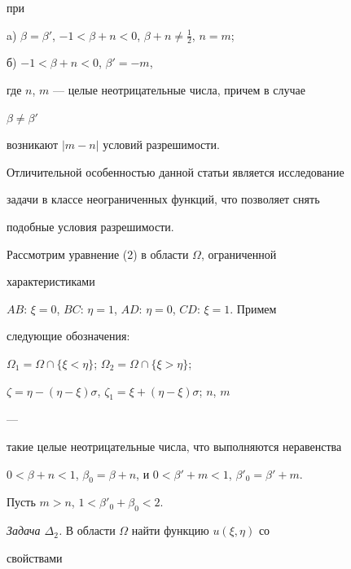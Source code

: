 при 


 


a) $\beta=\beta'$, $-1<\beta+n<0$, $\beta+n\ne\frac{1}{2}$, $n=m$; 


 


б) $-1<\beta+n<0$, $\beta'=-m$, 


 


\noindent{}где $n$, $m$ --- целые неотрицательные числа, причем в случае 


$\beta\ne\beta'$ 


возникают $|m-n|$ условий разрешимости. 


 


Отличительной особенностью данной статьи является исследование 


задачи в классе неограниченных функций, что позволяет снять 


подобные условия разрешимости. 


 


Рассмотрим уравнение (2) в области $\Omega$, ограниченной 


характеристиками 


$AB$: $\xi=0$, $BC$: $\eta=1$, $AD$: $\eta=0$, $CD$: $\xi=1$. Примем 


следующие обозначения: 


$\Omega_1=\Omega\cap\{\xi<\eta\}$; $\Omega_2=\Omega\cap\{\xi>\eta\}$; 


$\zeta=\eta-(\eta-\xi)\sigma$, $\zeta_1=\xi+(\eta-\xi)\sigma$; $n$, $m$ 


--- 


такие целые неотрицательные числа, что выполняются неравенства 


$0<\beta+n<1$, $\beta_0=\beta+n$, и $0<\beta'+m<1$, $\beta'_0=\beta'+m$. 


 


Пусть $m>n$, $1<\beta'_0+\beta_0<2$. 


\medskip 


 


{\it Задача $\Delta_2$.} В области $\Omega$ найти функцию $u(\xi,\eta)$ со 


свойствами 


